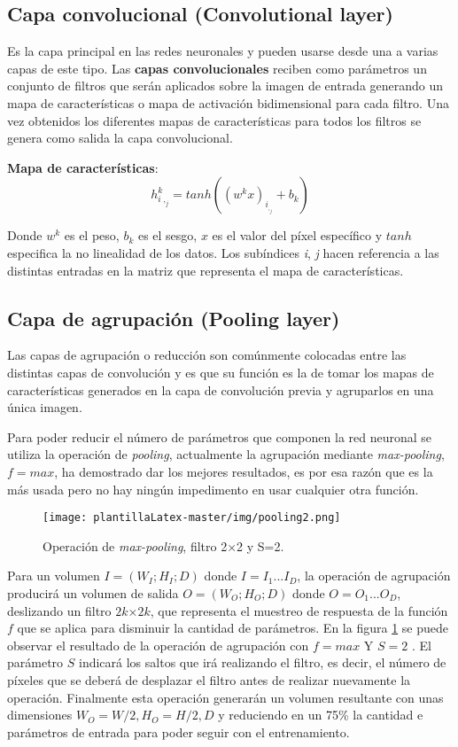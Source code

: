 \subsection{Capa convolucional (Convolutional layer)}

Es la capa principal en las redes neuronales y pueden usarse desde una a varias capas de este tipo. Las \textbf{capas convolucionales} reciben como parámetros un conjunto de filtros que serán aplicados sobre la imagen de entrada generando un mapa de características o mapa de activación bidimensional para cada filtro. Una vez obtenidos los diferentes mapas de características para todos los filtros se genera como salida la capa convolucional.  

\textbf{Mapa de características}:
\[h^{k}_i_,_j = tanh((w^{k}x)_i_,_j + b_k)\]

Donde $w^{k}$ es el peso, $b_k$ es el sesgo, $x$ es el valor del píxel específico y $tanh$ especifica la no linealidad de los datos. Los subíndices \emph{i}, \emph{j} hacen referencia a las distintas entradas en la matriz que representa el mapa de características.

\subsection{Capa de agrupación (Pooling layer)}
Las capas de agrupación o reducción son comúnmente colocadas entre las distintas capas de convolución y es que su función es la de tomar los mapas de características generados en la capa de convolución previa y agruparlos en una única imagen. 

Para poder reducir el número de parámetros que componen la red neuronal se utiliza la operación de \textit{pooling}, actualmente la agrupación mediante \textit{max-pooling},$f = max$, ha demostrado dar los mejores resultados, es por esa razón que es la más usada pero no hay ningún impedimento en usar cualquier otra función. 

\begin{figure}
 \centering
    \texttt{[image: plantillaLatex-master/img/pooling2.png]}
    \caption{Operación de \textit{max-pooling}, filtro 2×2 y S=2.}
    \label{f:pool_2}
\end{figure}


Para un volumen $I=(W_I;H_I;D)$ donde $I={I_1...I_D}$, la operación de agrupación producirá un volumen de salida $O=(W_O;H_O;D)$ donde $O={O_1...O_D}$, deslizando un filtro  $2k$×$2k$, que representa el muestreo de respuesta de la función $f$ que se aplica para disminuir la cantidad de parámetros. En la figura \ref{f:pool_2} se puede observar el resultado de la operación de agrupación con $f=max$ Y $S=2$ . El parámetro $S$ indicará los saltos que irá realizando el filtro, es decir, el número de píxeles que se deberá de desplazar el filtro antes de realizar nuevamente la operación. Finalmente esta operación generarán un volumen resultante con unas dimensiones $W_O= W/2, H_O=H/2, D$ y reduciendo en un 75\% la cantidad e parámetros de entrada para poder seguir con el entrenamiento. 

